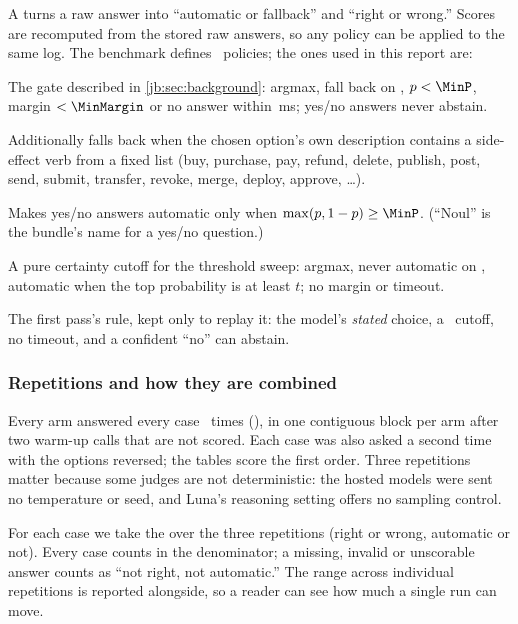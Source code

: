 A  turns a raw answer into ``automatic or fallback'' and ``right or wrong.'' Scores are
recomputed from the stored raw answers, so any policy can be applied to the same log. The benchmark
defines \NumPolicies\ policies; the ones used in this report are:
\begin{description}[leftmargin=1.2em,style=nextline]
  \item[\code{bundle-read-shortcut} (primary)] The gate described in \cref{jb:sec:background}: argmax, fall
    back on , $p<\MinP$, margin $<\MinMargin$ or no answer within \TimeoutMs\,ms; yes/no
    answers never abstain.
  \item[\code{+host-guard} (intervention I2)] Additionally falls back when the chosen option's own
    description contains a side-effect verb from a fixed list (buy, purchase, pay, refund, delete,
    publish, post, send, submit, transfer, revoke, merge, deploy, approve, \dots).
  \item[\code{+noul-gate} (intervention I3)] Makes yes/no answers automatic only when
    $\max(p, 1-p) \ge \MinP$. (``Noul'' is the bundle's name for a yes/no question.)
  \item[\code{cutoff-$t$}] A pure certainty cutoff for the threshold sweep: argmax, never automatic on
    , automatic when the top probability is at least $t$; no margin or timeout.
  \item[\code{study-0.75}] The first pass's rule, kept only to replay it: the model's \emph{stated}
    choice, a \StudyCutoff\ cutoff, no timeout, and a confident ``no'' can abstain.
\end{description}

\subsubsection{Repetitions and how they are combined}

Every arm answered every case \DevReps\ times (), in one contiguous block per arm after
two warm-up calls that are not scored. Each case was also asked a second time with the options reversed;
the tables score the first order. Three repetitions matter because some judges are not deterministic:
the hosted models were sent no temperature or seed, and Luna's reasoning setting offers no sampling
control.

\begin{keyidea}
For each case we take the  over the three repetitions (right or wrong,
automatic or not). Every case counts in the denominator; a missing, invalid or unscorable answer counts
as ``not right, not automatic.'' The range across individual repetitions is reported alongside, so a
reader can see how much a single run can move.
\end{keyidea}

